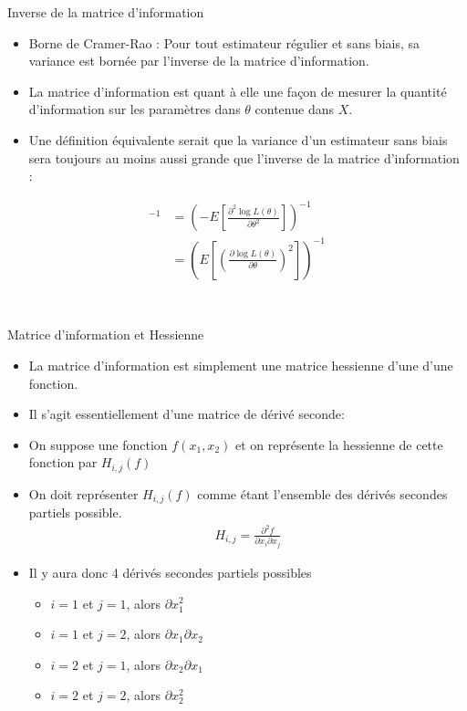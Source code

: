 \documentclass{beamer}
\begin{document}
\begin{frame}{Inverse de la matrice d'information}
\begin{itemize}
\item Borne de Cramer-Rao : Pour tout estimateur régulier et sans biais, sa variance
est bornée par l’inverse de la matrice d’information.
\item La matrice d’information est quant à elle une façon de mesurer la quantité
d’information sur les paramètres dans $\theta$ contenue dans $X$.
\item Une définition équivalente serait que la variance d’un estimateur sans biais
sera toujours au moins aussi grande que l’inverse de la matrice d’information :
\end{itemize}

\begin{align*}
[I(\theta)]^{-1} &=\left( -E \left[\frac{\partial^2 \log L(\theta)}{\partial \theta^2} \right] \right)^{-1} \\ &=\left( E \left[ \left(\frac{\partial \log L(\theta)}{\partial \theta}\right)^2 \right] \right)^{-1}
\end{align*}

\\
\end{frame}

\begin{frame}{Matrice d'information et Hessienne}


\begin{itemize}
\item La matrice d'information est simplement une matrice hessienne d'une d'une fonction.
\item Il s'agit essentiellement d'une matrice de dérivé seconde: 
\item On suppose une fonction $f(x_1, x_2)$ et on représente la hessienne de cette fonction par $H_{i,j}(f)$
\item On doit représenter $H_{i,j}(f)$ comme étant l'ensemble des dérivés secondes partiels possible.
\begin{align*}
H_{i,j}=\frac{\partial^2 f}{\partial x_i \partial x_j}
\end{align*}
\item Il y aura donc 4 dérivés secondes partiels possibles
\begin{itemize}
\item $i=1$ et $j=1$, alors $\partial x_1^2$
\item $i=1$ et $j=2$, alors $\partial x_1 \partial x_2$
\item $i=2$ et $j=1$, alors $\partial x_2 \partial x_1$
\item $i=2$ et $j=2$, alors $\partial x_2^2$
\end{itemize}
\end{itemize}

\end{frame}
\end{document}
